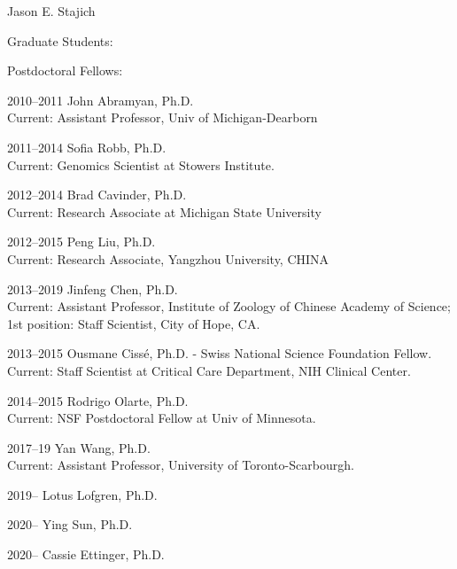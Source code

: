 \documentclass[10pt]{article}
\begin{document}
\begin{cv}{\centerline{Jason E. Stajich}}
\begin{cvlistcompact}{Graduate Students:}
\end{cvlistcompact}

\begin{cvlistcompact}{Postdoctoral Fellows:}
\item [2010--2011] John Abramyan, Ph.D. \\
  Current: Assistant Professor, Univ of Michigan-Dearborn
\item [2011--2014] Sofia Robb, Ph.D. \\
  Current: Genomics Scientist at Stowers Institute.
\item [2012--2014] Brad Cavinder, Ph.D. \\
  Current: Research Associate at Michigan State University
\item [2012--2015] Peng Liu, Ph.D. \\
  Current: Research Associate, Yangzhou University, CHINA
\item [2013--2019] Jinfeng Chen, Ph.D. \\
Current: Assistant Professor, Institute of Zoology of Chinese Academy of Science; 1st position: Staff Scientist, City of Hope, CA.
\item [2013--2015] Ousmane Ciss\'{e}, Ph.D. - Swiss National Science
  Foundation Fellow. \\
  Current: Staff Scientist at Critical Care Department, NIH Clinical Center.
\item [2014--2015] Rodrigo Olarte, Ph.D. \\
  Current: NSF Postdoctoral Fellow at Univ of Minnesota.
\item [2017--19] Yan Wang, Ph.D. \\
  Current: Assistant Professor, University of Toronto-Scarbourgh.
\item [2019--] Lotus Lofgren, Ph.D.
\item [2020--] Ying Sun, Ph.D.
\item [2020--] Cassie Ettinger, Ph.D.
\end{cvlistcompact}


\end{cv}
\end{document}
